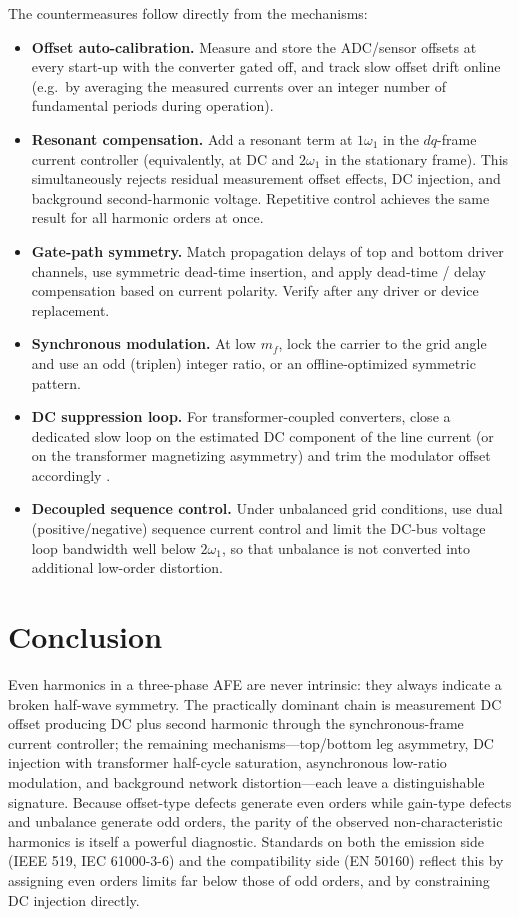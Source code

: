 \documentclass[11pt,a4paper]{article}
\newcommand{\dq}{\ensuremath{dq}}
\begin{document}
The countermeasures follow directly from the mechanisms:
%
\begin{itemize}
\item \textbf{Offset auto-calibration.} Measure and store the ADC/sensor
offsets at every start-up with the converter gated off, and track slow offset
drift online (e.g.\ by averaging the measured currents over an integer number
of fundamental periods during operation).
\item \textbf{Resonant compensation.} Add a resonant term at $1\omega_1$ in the
$\dq$-frame current controller (equivalently, at DC and $2\omega_1$ in the
stationary frame). This simultaneously rejects residual measurement offset
effects, DC injection, and background second-harmonic voltage. Repetitive
control achieves the same result for all harmonic orders at once.
\item \textbf{Gate-path symmetry.} Match propagation delays of top and bottom
driver channels, use symmetric dead-time insertion, and apply dead-time /
delay compensation based on current polarity. Verify after any driver or
device replacement.
\item \textbf{Synchronous modulation.} At low $m_f$, lock the carrier to the
grid angle and use an odd (triplen) integer ratio, or an offline-optimized
symmetric pattern.
\item \textbf{DC suppression loop.} For transformer-coupled converters, close a
dedicated slow loop on the estimated DC component of the line current (or on
the transformer magnetizing asymmetry) and trim the modulator offset
accordingly \cite{buticchi}.
\item \textbf{Decoupled sequence control.} Under unbalanced grid conditions,
use dual (positive/negative) sequence current control and limit the DC-bus
voltage loop bandwidth well below $2\omega_1$, so that unbalance is not
converted into additional low-order distortion.
\end{itemize}

\section{Conclusion}

Even harmonics in a three-phase AFE are never intrinsic: they always indicate a
broken half-wave symmetry. The practically dominant chain is measurement DC
offset producing DC plus second harmonic through the synchronous-frame current
controller; the remaining mechanisms---top/bottom leg asymmetry, DC injection
with transformer half-cycle saturation, asynchronous low-ratio modulation, and
background network distortion---each leave a distinguishable signature. Because
offset-type defects generate even orders while gain-type defects and unbalance
generate odd orders, the parity of the observed non-characteristic harmonics is
itself a powerful diagnostic. Standards on both the emission side (IEEE 519,
IEC 61000-3-6) and the compatibility side (EN 50160) reflect this by assigning
even orders limits far below those of odd orders, and by constraining DC
injection directly.
\end{document}
